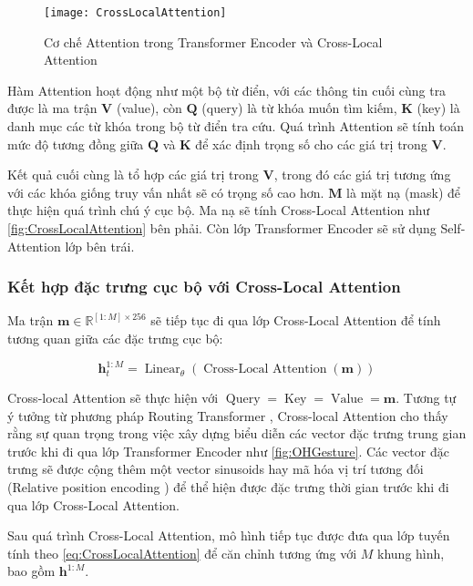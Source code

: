 \begin{figure}[H]
	\centering
	\texttt{[image: CrossLocalAttention]}
	\caption{Cơ chế Attention trong Transformer Encoder và Cross-Local Attention}
	\label{fig:CrossLocalAttention}
\end{figure}

Hàm Attention hoạt động như một bộ từ điển, với các thông tin cuối cùng tra được là ma trận $\mathbf{V}$ (value), còn $\mathbf{Q}$ (query) là từ khóa muốn tìm kiếm, $\mathbf{K}$ (key) là danh mục các từ khóa trong bộ từ điển tra cứu. Quá trình Attention sẽ tính toán mức độ tương đồng giữa \( \mathbf{Q} \) và \( \mathbf{K} \) để xác định trọng số cho các giá trị trong \( \mathbf{V} \). 

Kết quả cuối cùng là tổ hợp các giá trị trong \( \mathbf{V} \), trong đó các giá trị tương ứng với các khóa giống truy vấn nhất sẽ có trọng số cao hơn. $\mathbf{M}$ là mặt nạ (mask) để thực hiện quá trình chú ý cục bộ. Ma nạ sẽ tính Cross-Local Attention như \autoref{fig:CrossLocalAttention} bên phải. Còn lớp Transformer Encoder sẽ sử dụng Self-Attention lớp bên trái.

\subsubsection{Kết hợp đặc trưng cục bộ với Cross-Local Attention}

Ma trận $\mathbf{m} \in \mathbb{R}^{[1:M] \times 256}$ sẽ tiếp tục đi qua lớp Cross-Local Attention để tính tương quan giữa các đặc trưng cục bộ: 

\begin{equation}
	\mathbf{h}^{1:M}_{t}  = \operatorname{Linear}_{\theta}  ( \operatorname{Cross-Local\ Attention}( \mathbf{m}) )
	\label{eq:CrossLocalAttention}
\end{equation}

Cross-local Attention sẽ thực hiện với $\operatorname{Query} = \operatorname{Key} = \operatorname{Value} = \mathbf{m}$. 
Tương tự ý tưởng từ phương pháp Routing Transformer \cite{roy2021efficient}, Cross-local Attention cho thấy rằng sự quan trọng trong việc xây dựng biểu diễn các vector đặc trưng trung gian trước khi đi qua lớp Transformer Encoder như \autoref{fig:OHGesture}. 
Các vector đặc trưng sẽ được cộng thêm một vector sinusoids hay mã hóa vị trí tương đối (Relative position encoding \cite{vaswani2017attention}) để thể hiện được đặc trưng thời gian trước khi đi qua lớp Cross-Local Attention.


Sau quá trình Cross-Local Attention, mô hình tiếp tục được đưa qua lớp tuyến tính theo \autoref{eq:CrossLocalAttention} để căn chỉnh tương ứng với $M$ khung hình, bao gồm $\mathbf{h}^{1:M}$.


